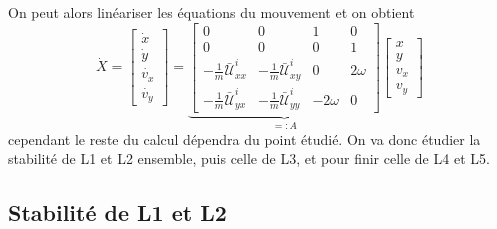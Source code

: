 \documentclass[12pt]{article}
\theoremstyle{definition}
\theoremstyle{definition}
\begin{document}
	On peut alors linéariser les équations du mouvement et on obtient
	\begin{equation}
		\label{eq du mvt}
		\dot{X}
		=
		\begin{bmatrix}
			\dot{x} \\
			\dot{y} \\
			\dot{v_x} \\
			\dot{v_y}
		\end{bmatrix}
		=
		\underbrace{
			\begin{bmatrix}
				0 & 0 & 1 & 0 \\
				0 & 0 & 0 & 1 \\
				-\frac{1}{m}\bar{\mathcal{U}}_{xx}^i & -\frac{1}{m}\bar{\mathcal{U}}_{xy}^i
				& 0 & 2\omega \\
				-\frac{1}{m}\bar{\mathcal{U}}_{yx}^i & -\frac{1}{m}\bar{\mathcal{U}}_{yy}^i
				& -2\omega & 0
			\end{bmatrix}
		}_{=: A}
		\begin{bmatrix}
			x \\ y \\ v_x \\ v_y
		\end{bmatrix}
	\end{equation}
	cependant le reste du calcul dépendra du point étudié. On va donc étudier la stabilité de L1 et L2 ensemble, puis celle de L3, et pour finir celle de L4 et L5.
	
	
	\subsection{Stabilité de L1 et L2}
\end{document}
